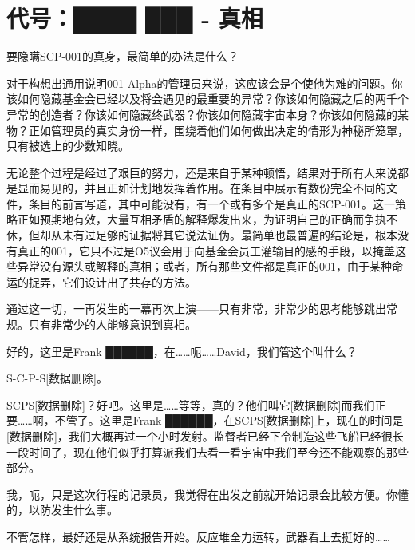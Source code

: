 \chapter{代号：████ ███ - 真相}

\label{chap:TAIL-code-name-the-truth}

要隐瞒SCP-001的真身，最简单的办法是什么？

对于构想出通用说明001-Alpha的管理员来说，这应该会是个使他为难的问题。你该如何隐藏基金会已经以及将会遇见的最重要的异常？你该如何隐藏之后的两千个异常的创造者？你该如何隐藏终武器？你该如何隐藏宇宙本身？你该如何隐藏的某物？正如管理员的真实身份一样，围绕着他们如何做出决定的情形为神秘所笼罩，只有被选上的少数知晓。

无论整个过程是经过了艰巨的努力，还是来自于某种顿悟，结果对于所有人来说都是显而易见的，并且正如计划地发挥着作用。在条目中展示有数份完全不同的文件，条目的前言写道，其中可能没有，有一个或有多个是真正的SCP-001。这一策略正如预期地有效，大量互相矛盾的解释爆发出来，为证明自己的正确而争执不休，但却从未有过足够的证据将其它说法证伪。最简单也最普遍的结论是，根本没有真正的001，它只不过是O5议会用于向基金会员工灌输目的感的手段，以掩盖这些异常没有源头或解释的真相；或者，所有那些文件都是真正的001，由于某种命运的捉弄，它们设计出了共存的方法。

通过这一切，一再发生的一幕再次上演——只有非常，非常少的思考能够跳出常规。只有非常少的人能够意识到真相。

\hr

\begin{scpbox}


\end{scpbox}

\begin{scpbox}


好的，这里是Frank ██████，在……呃……David，我们管这个叫什么？

S-C-P-S{[}数据删除]。

SCPS{[}数据删除]？好吧。这里是……等等，真的？他们叫它{[}数据删除]而我们正要……啊，不管了。这里是Frank ██████，在SCPS{[}数据删除]上，现在的时间是{[}数据删除]，我们大概再过一个小时发射。监督者已经下令制造这些飞船已经很长一段时间了，现在他们似乎打算派我们去看一看宇宙中我们至今还不能观察的那些部分。

我，呃，只是这次行程的记录员，我觉得在出发之前就开始记录会比较方便。你懂的，以防发生什么事。

不管怎样，最好还是从系统报告开始。反应堆全力运转，武器看上去挺好的……

\end{scpbox}

